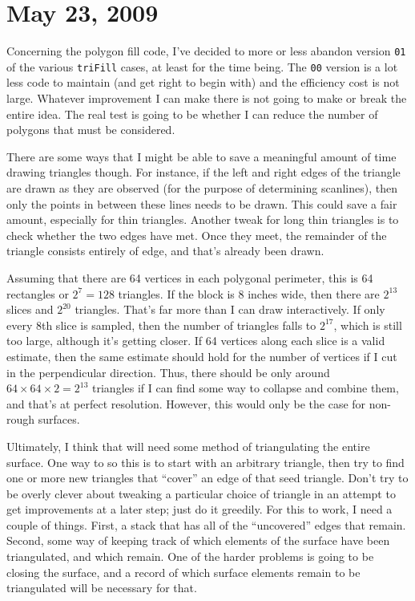 \documentclass[titlepage,oneside,10pt]{article}
\begin{document}
\section{May 23, 2009}

Concerning the polygon fill code, I've decided to more or less abandon
version {\tt 01} of the various {\tt triFill} cases, at least for the
time being. The {\tt 00} version is a lot less code to maintain (and
get right to begin with) and the efficiency cost is not
large. Whatever improvement I can make there is not going to make or
break the entire idea. The real test is going to be whether I can
reduce the number of polygons that must be considered.

There are some ways that I might be able to save a meaningful amount
of time drawing triangles though. For instance, if the left and right
edges of the triangle are drawn as they are observed (for the purpose
of determining scanlines), then only the points in between these lines
needs to be drawn. This could save a fair amount, especially for thin
triangles. Another tweak for long thin triangles is to check whether
the two edges have met. Once they meet, the remainder of the triangle
consists entirely of edge, and that's already been drawn.

Assuming that there are 64 vertices in each polygonal perimeter, this
is 64 rectangles or $2^7=128$ triangles. If the block is 8 inches
wide, then there are $2^{13}$ slices and $2^{20}$ triangles. That's
far more than I can draw interactively. If only every 8th slice is
sampled, then the number of triangles falls to $2^{17}$, which is
still too large, although it's getting closer. If 64 vertices along
each slice is a valid estimate, then the same estimate should hold for
the number of vertices if I cut in the perpendicular direction. Thus,
there should be only around $64\times64\times2 = 2^{13}$ triangles
if I can find some way to collapse and combine them, and that's at
perfect resolution. However, this would only be the case for non-rough
surfaces.

Ultimately, I think that will need some method of triangulating the entire
surface. One way to so this is to start with an arbitrary triangle,
then try to find one or more new triangles that ``cover'' an edge of
that seed triangle. Don't try to be overly clever about tweaking a
particular choice of triangle in an attempt to get improvements at a
later step; just do it greedily. For this to work, I need a couple of
things. First, a stack that has all of the ``uncovered'' edges that
remain. Second, some way of keeping track of which elements of the
surface have been triangulated, and which remain. One of the harder
problems is going to be closing the surface, and a record of which
surface elements remain to be triangulated will be necessary for
that.
\end{document}
